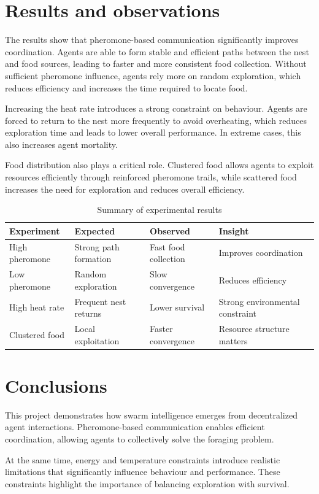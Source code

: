\documentclass[11pt]{article}
\begin{document}
\section{Results and observations}

The results show that pheromone-based communication significantly improves coordination. Agents are able to form stable and efficient paths between the nest and food sources, leading to faster and more consistent food collection. Without sufficient pheromone influence, agents rely more on random exploration, which reduces efficiency and increases the time required to locate food.

Increasing the heat rate introduces a strong constraint on behaviour. Agents are forced to return to the nest more frequently to avoid overheating, which reduces exploration time and leads to lower overall performance. In extreme cases, this also increases agent mortality.

Food distribution also plays a critical role. Clustered food allows agents to exploit resources efficiently through reinforced pheromone trails, while scattered food increases the need for exploration and reduces overall efficiency.

\begin{table}[h]
\centering
\small
\begin{tabular}{l l l l}
\toprule
\textbf{Experiment} & \textbf{Expected} & \textbf{Observed} & \textbf{Insight} \\
\midrule
High pheromone & Strong path formation & Fast food collection & Improves coordination \\
Low pheromone & Random exploration & Slow convergence & Reduces efficiency \\
High heat rate & Frequent nest returns & Lower survival & Strong environmental constraint \\
Clustered food & Local exploitation & Faster convergence & Resource structure matters \\
\bottomrule
\end{tabular}
\caption{Summary of experimental results}
\end{table}


\section{Conclusions}

This project demonstrates how swarm intelligence emerges from decentralized agent interactions. Pheromone-based communication enables efficient coordination, allowing agents to collectively solve the foraging problem.

At the same time, energy and temperature constraints introduce realistic limitations that significantly influence behaviour and performance. These constraints highlight the importance of balancing exploration with survival.

    
\end{document}
